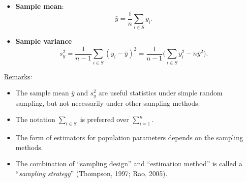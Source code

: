 \begin{Regular}{}
    \begin{itemize}
        \item \textbf{Sample mean}:
              \[ \bar{y}=\frac{1}{n}\sum_{i\in S}y_i. \]
        \item \textbf{Sample variance}
              \[ s_y^2=\frac{1}{n-1}\sum_{i\in S}(y_i-\bar{y})^2=\frac{1}{n-1}\biggl(\sum_{i\in S}y_i^2-n\bar{y}^2\biggr). \]
    \end{itemize}
    \tcblower{}
    \underline{Remarks}:
    \begin{itemize}
        \item The sample mean $ \bar{y} $ and $ s_y^2 $ are useful
              statistics under simple random sampling, but not necessarily under
              other sampling methods.
        \item The notation $ \sum_{i\in S} $ is preferred over
              $ \sum_{i=1}^{n} $.
        \item The form of estimators for population parameters depends on the
              sampling methods.
        \item The combination of ``sampling design'' and ``estimation method''
              is called a ``\emph{sampling strategy}'' (Thompson, 1997; Rao, 2005).
    \end{itemize}
\end{Regular}
